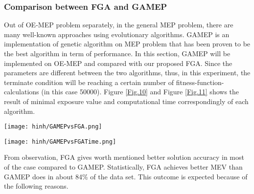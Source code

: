 \documentclass[final]{elsarticle}
\begin{document}
\subsubsection{Comparison between FGA and GAMEP}
Out of OE-MEP problem separately, in the general MEP problem, there are many well-known approaches using evolutionary algorithms. GAMEP \cite{binh2019efficient} is an implementation of genetic algorithm on MEP problem that has been proven to be the best algorithm in term of performance. In this section, GAMEP will be implemented on OE-MEP and compared with our proposed FGA. Since the parameters are different between the two algorithms, thus, in this experiment, the terminate condition will be reaching a certain number of fitness-function-calculations (in this case 50000). Figure \ref{Fig.10} and Figure \ref{Fig.11} shows the result of minimal exposure value and computational time correspondingly of each algorithm.
\begin{figure*}[h]
	\texttt{[image: hinh/GAMEPvsFGA.png]}
	\centering
	\caption{The Minimal Exposure Value comparison between FGA and GAMEP on some noble topologies
	}
	\label{Fig.10}       %
\end{figure*}
\begin{figure*}[h]
	\texttt{[image: hinh/GAMEPvsFGATime.png]}
	\centering
	\caption{The Computational Time (sec) comparison between FGA and GAMEP on some noble topologies
	}
	\label{Fig.11}       %
\end{figure*}
From observation, FGA gives worth mentioned better solution accuracy in most of the case compared to GAMEP. Statistically, FGA achieves better MEV than GAMEP does in about 84\% of the data set. This outcome is expected because of  the following reasons.
\end{document}
